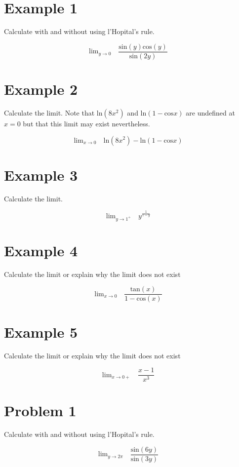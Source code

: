 \documentclass[11pt]{article}
\begin{document}
\section*{Example 1}

Calculate with and without using l'Hopital's rule.

$$\text{lim}_{y\rightarrow 0} \quad \frac{\text{sin}(y)\text{cos}(y)}{\text{sin}(2y)} $$

\section*{Example 2}

Calculate the limit. Note that $\text{ln}(8x^2)$ and $\text{ln}(1-\text{cos}x)$ are undefined at $x = 0$ but that this limit may exist nevertheless. 

$$\text{lim}_{x \rightarrow 0} \quad \text{ln}(8x^2) - \text{ln}(1-\text{cos}x) $$
\section*{Example 3}

Calculate the limit.

$$\text{lim}_{y\rightarrow 1^+} \quad y^{\frac{1}{1-y}} $$

\section*{Example 4}

Calculate the limit or explain why the limit does not exist

$$\text{lim}_{x\rightarrow 0} \quad \frac{\text{tan}(x)}{1-\text{cos}(x)}$$

\section*{Example 5}

Calculate the limit or explain why the limit does not exist

$$\text{lim}_{x\rightarrow 0+} \quad \frac{x-1}{x^3}$$

\section*{Problem 1}

Calculate with and without using l'Hopital's rule.

$$\text{lim}_{y\rightarrow 2\pi} \quad \frac{\text{sin}(6y)}{\text{sin}(3y)} $$
\end{document}
